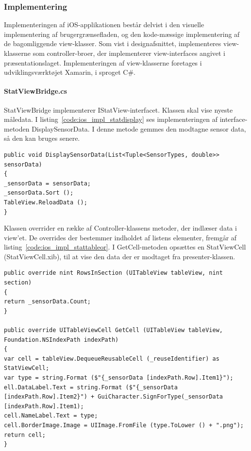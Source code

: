 \subsubsection{Implementering}
Implementeringen af iOS-applikationen består delvist i den visuelle implementering af brugergrænsefladen, og den kode-mæssige implementering af de bagomliggende view-klasser. Som vist i designafsnittet, implementeres view-klasserne som controller-broer, der implementerer view-interfaces angivet i præsentationslaget. Implementeringen af view-klasserne foretages i udviklingsværktøjet Xamarin, i sproget C\#. 

\paragraph{StatViewBridge.cs}
StatViewBridge implementerer IStatView-interfacet. Klassen skal vise nyeste måledata. I listing~\ref{code:ios_impl_statdisplay} ses implementeringen af interface-metoden DisplaySensorData. I denne metode gemmes den modtagne sensor data, så den kan bruges senere.

\begin{lstlisting}[caption={DisplaySensorData(...)},label={code:ios_impl_statdisplay}]
public void DisplaySensorData(List<Tuple<SensorTypes, double>> sensorData)
{
_sensorData = sensorData;
_sensorData.Sort ();
TableView.ReloadData ();
}
\end{lstlisting}

Klassen overrider en række af Controller-klassens metoder, der indlæser data i view'et. De overrides der bestemmer indholdet af listens elementer, fremgår af listing~\ref{code:ios_impl_stattableor}. I GetCell-metoden opsættes en StatViewCell (StatViewCell.xib), til at vise den data der er modtaget fra presenter-klassen.

\begin{lstlisting}[caption={Overrides af UITableViewController-metoder i StatViewBridge},label={code:ios_impl_stattableor}]
public override nint RowsInSection (UITableView tableView, nint section)
{
return _sensorData.Count;
}

public override UITableViewCell GetCell (UITableView tableView, Foundation.NSIndexPath indexPath)
{	
var cell = tableView.DequeueReusableCell (_reuseIdentifier) as StatViewCell;
var type = string.Format ($"{_sensorData [indexPath.Row].Item1}");
ell.DataLabel.Text = string.Format ($"{_sensorData [indexPath.Row].Item2}") + GuiCharacter.SignForType(_sensorData [indexPath.Row].Item1);
cell.NameLabel.Text = type;
cell.BorderImage.Image = UIImage.FromFile (type.ToLower () + ".png");
return cell;
}
\end{lstlisting}

